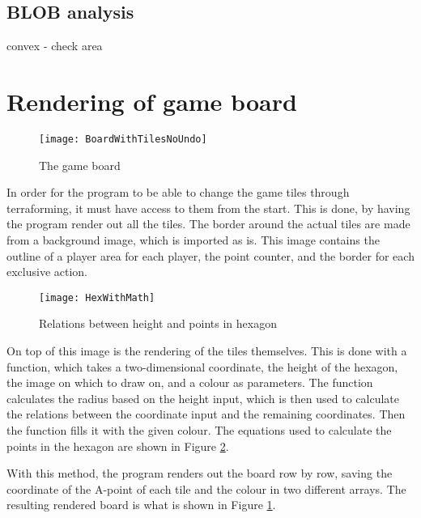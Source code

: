  
 

\subsection{BLOB analysis}
convex - check area




\section{Rendering of game board}
\begin{figure}[h!]
\centering \texttt{[image: BoardWithTilesNoUndo]}
\caption{The game board \label{Fig:Board}}
\end{figure}
In order for the program to be able to change the game tiles through terraforming, it must have access to them from the start. This is done, by having the program render out all the tiles. The border around the actual tiles are made from a background image, which is imported as is. This image contains the outline of a player area for each player, the point counter, and the border for each exclusive action. 
\begin{figure}[h!]
\centering \texttt{[image: HexWithMath]}
\caption{Relations between height and points in hexagon \label{Fig:HexWithMath}}
\end{figure}

On top of this image is the rendering of the tiles themselves. This is done with a function, which takes a two-dimensional coordinate, the height of the hexagon, the image on which to draw on, and a colour as parameters. The function calculates the radius based on the height input, which is then used to calculate the relations between the coordinate input and the remaining coordinates. Then the function fills it with the given colour. The equations used to calculate the points in the hexagon are shown in Figure \ref{Fig:HexWithMath}.

With this method, the program renders out the board row by row, saving the coordinate of the A-point of each tile and the colour in two different arrays. The resulting rendered board is what is shown in Figure \ref{Fig:Board}.